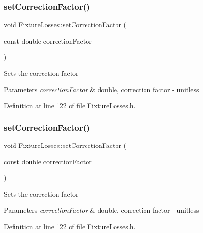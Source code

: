 \subsubsection{\texorpdfstring{set\+Correction\+Factor()}{setCorrectionFactor()}\hspace{0.1cm}{\footnotesize\ttfamily [2/3]}}
{\footnotesize\ttfamily void Fixture\+Losses\+::set\+Correction\+Factor (\begin{DoxyParamCaption}\item[{const double}]{correction\+Factor }\end{DoxyParamCaption})\hspace{0.3cm}{\ttfamily [inline]}}

Sets the correction factor 
\begin{DoxyParams}{Parameters}
{\em correction\+Factor} & double, correction factor -\/ unitless \\
\hline
\end{DoxyParams}


Definition at line 122 of file Fixture\+Losses.\+h.

\mbox{\label{class_fixture_losses_a3a3dd839d71adb630e7ce76644f18098}} 
\subsubsection{\texorpdfstring{set\+Correction\+Factor()}{setCorrectionFactor()}\hspace{0.1cm}{\footnotesize\ttfamily [3/3]}}
{\footnotesize\ttfamily void Fixture\+Losses\+::set\+Correction\+Factor (\begin{DoxyParamCaption}\item[{const double}]{correction\+Factor }\end{DoxyParamCaption})\hspace{0.3cm}{\ttfamily [inline]}}

Sets the correction factor 
\begin{DoxyParams}{Parameters}
{\em correction\+Factor} & double, correction factor -\/ unitless \\
\hline
\end{DoxyParams}


Definition at line 122 of file Fixture\+Losses.\+h.

\mbox{\label{class_fixture_losses_a6543643db6b28f3a78397c97d9c5135f}} 
